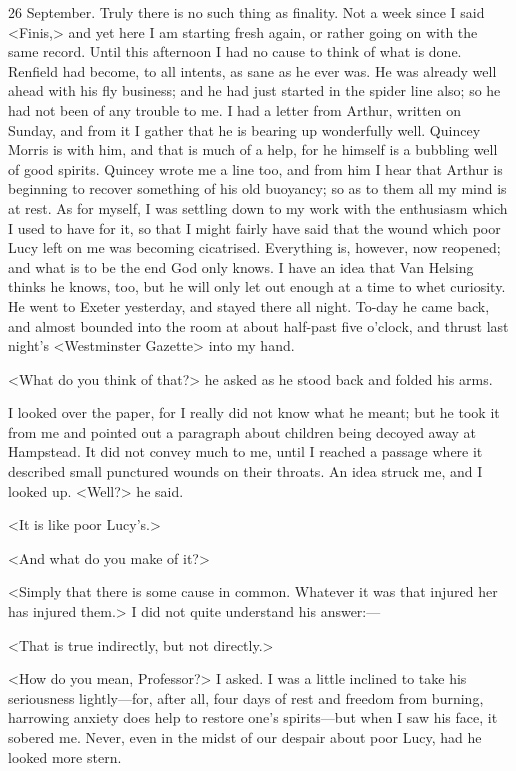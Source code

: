 \begin{diary}{26 September.}
Truly there is no such thing as finality. Not a week since I said <Finis,> and yet here I am starting fresh again, or rather going on with the same record. Until this afternoon I had no cause to think of what is done. Renfield had become, to all intents, as sane as he ever was. He was already well ahead with his fly business; and he had just started in the spider line also; so he had not been of any trouble to me. I had a letter from Arthur, written on Sunday, and from it I gather that he is bearing up wonderfully well. Quincey Morris is with him, and that is much of a help, for he himself is a bubbling well of good spirits. Quincey wrote me a line too, and from him I hear that Arthur is beginning to recover something of his old buoyancy; so as to them all my mind is at rest. As for myself, I was settling down to my work with the enthusiasm which I used to have for it, so that I might fairly have said that the wound which poor Lucy left on me was becoming cicatrised. Everything is, however, now reopened; and what is to be the end God only knows. I have an idea that Van Helsing thinks he knows, too, but he will only let out enough at a time to whet curiosity. He went to Exeter yesterday, and stayed there all night. To-day he came back, and almost bounded into the room at about half-past five o'clock, and thrust last night's <Westminster Gazette> into my hand.

<What do you think of that?> he asked as he stood back and folded his arms.

I looked over the paper, for I really did not know what he meant; but he took it from me and pointed out a paragraph about children being decoyed away at Hampstead. It did not convey much to me, until I reached a passage where it described small punctured wounds on their throats. An idea struck me, and I looked up. <Well?> he said.

<It is like poor Lucy's.>

<And what do you make of it?>

<Simply that there is some cause in common. Whatever it was that injured her has injured them.> I did not quite understand his answer:—

<That is true indirectly, but not directly.>

<How do you mean, Professor?> I asked. I was a little inclined to take his seriousness lightly—for, after all, four days of rest and freedom from burning, harrowing anxiety does help to restore one's spirits—but when I saw his face, it sobered me. Never, even in the midst of our despair about poor Lucy, had he looked more stern.


\end{diary}

